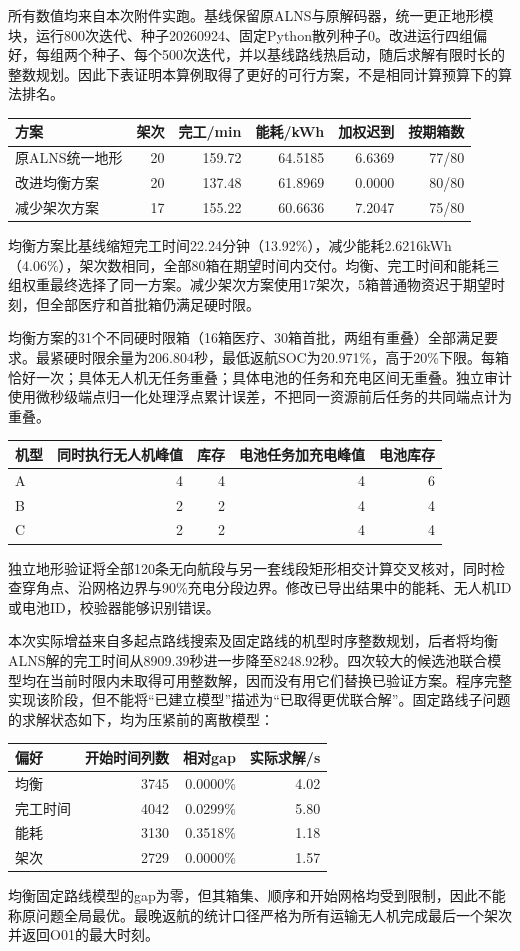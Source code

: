 所有数值均来自本次附件实跑。基线保留原ALNS与原解码器，统一更正地形模块，运行800次迭代、种子20260924、固定Python散列种子0。改进运行四组偏好，每组两个种子、每个500次迭代，并以基线路线热启动，随后求解有限时长的整数规划。因此下表证明本算例取得了更好的可行方案，不是相同计算预算下的算法排名。
\begin{center}
\begin{tabular}{lrrrrr}\toprule
方案 & 架次 & 完工/min & 能耗/kWh & 加权迟到 & 按期箱数\\\midrule
原ALNS统一地形 & 20 & 159.72 & 64.5185 & 6.6369 & 77/80 \\
改进均衡方案 & 20 & 137.48 & 61.8969 & 0.0000 & 80/80 \\
减少架次方案 & 17 & 155.22 & 60.6636 & 7.2047 & 75/80 \\
\bottomrule\end{tabular}\end{center}
均衡方案比基线缩短完工时间22.24分钟（13.92\%），减少能耗2.6216kWh（4.06\%），架次数相同，全部80箱在期望时间内交付。均衡、完工时间和能耗三组权重最终选择了同一方案。减少架次方案使用17架次，5箱普通物资迟于期望时刻，但全部医疗和首批箱仍满足硬时限。

均衡方案的31个不同硬时限箱（16箱医疗、30箱首批，两组有重叠）全部满足要求。最紧硬时限余量为206.804秒，最低返航SOC为20.971\%，高于20\%下限。每箱恰好一次；具体无人机无任务重叠；具体电池的任务和充电区间无重叠。独立审计使用微秒级端点归一化处理浮点累计误差，不把同一资源前后任务的共同端点计为重叠。
\begin{center}\begin{tabular}{lrrrr}\toprule
机型 & 同时执行无人机峰值 & 库存 & 电池任务加充电峰值 & 电池库存\\\midrule
A & 4 & 4 & 4 & 6 \\
B & 2 & 2 & 4 & 4 \\
C & 2 & 2 & 4 & 4 \\
\bottomrule\end{tabular}\end{center}
独立地形验证将全部120条无向航段与另一套线段矩形相交计算交叉核对，同时检查穿角点、沿网格边界与90\%充电分段边界。修改已导出结果中的能耗、无人机ID或电池ID，校验器能够识别错误。

本次实际增益来自多起点路线搜索及固定路线的机型时序整数规划，后者将均衡ALNS解的完工时间从8909.39秒进一步降至8248.92秒。四次较大的候选池联合模型均在当前时限内未取得可用整数解，因而没有用它们替换已验证方案。程序完整实现该阶段，但不能将“已建立模型”描述为“已取得更优联合解”。固定路线子问题的求解状态如下，均为压紧前的离散模型：
\begin{center}\begin{tabular}{lrrr}\toprule
偏好 & 开始时间列数 & 相对gap & 实际求解/s\\\midrule
均衡 & 3745 & 0.0000\% & 4.02 \\
完工时间 & 4042 & 0.0299\% & 5.80 \\
能耗 & 3130 & 0.3518\% & 1.18 \\
架次 & 2729 & 0.0000\% & 1.57 \\
\bottomrule\end{tabular}\end{center}
均衡固定路线模型的gap为零，但其箱集、顺序和开始网格均受到限制，因此不能称原问题全局最优。最晚返航的统计口径严格为所有运输无人机完成最后一个架次并返回O01的最大时刻。
